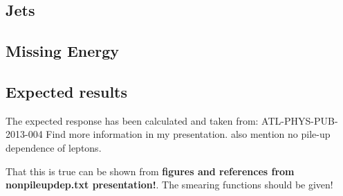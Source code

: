 \subsection{Jets}
\subsection{Missing Energy}
\subsection{Expected results}\label{cha:vali:sec:results:subsec:expr}

The expected response has been calculated and taken from: ATL-PHYS-PUB-2013-004
Find more information in my presentation. also mention no pile-up dependence of leptons.


That this is true can be shown from \textbf{figures and references from nonpileupdep.txt presentation!}. The smearing functions should be given! 

